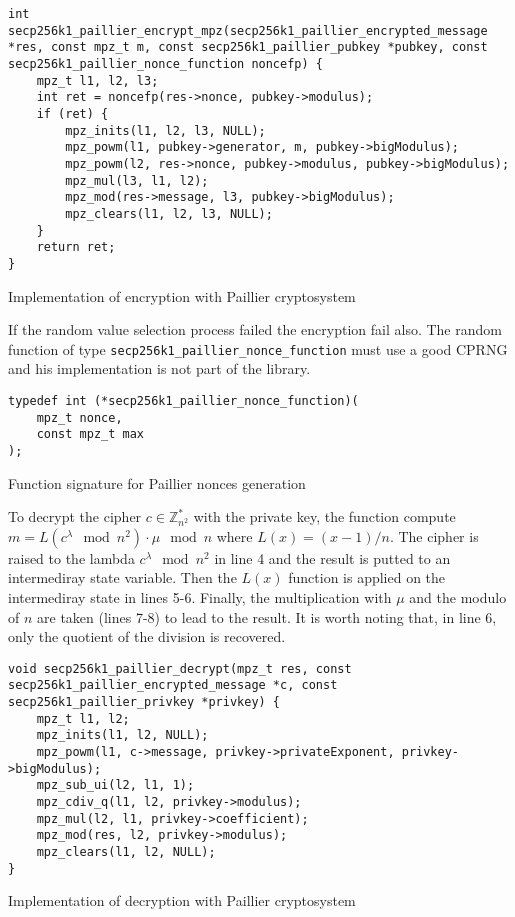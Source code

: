 \begin{listing}
  \begin{verbatim}
int secp256k1_paillier_encrypt_mpz(secp256k1_paillier_encrypted_message *res, const mpz_t m, const secp256k1_paillier_pubkey *pubkey, const secp256k1_paillier_nonce_function noncefp) {
    mpz_t l1, l2, l3;
    int ret = noncefp(res->nonce, pubkey->modulus);
    if (ret) {
        mpz_inits(l1, l2, l3, NULL);
        mpz_powm(l1, pubkey->generator, m, pubkey->bigModulus);
        mpz_powm(l2, res->nonce, pubkey->modulus, pubkey->bigModulus);
        mpz_mul(l3, l1, l2);
        mpz_mod(res->message, l3, pubkey->bigModulus);
        mpz_clears(l1, l2, l3, NULL);
    }
    return ret;
}
  \end{verbatim}
	\caption{Implementation of encryption with Paillier cryptosystem}
	\label{lst:implEncryptPaillier}
\end{listing}

If the random value selection
process failed the encryption fail also. The random function of type
\texttt{secp256k1\_paillier\_nonce\_function} must use a good CPRNG and his implementation
is not part of the library.

\begin{listing}
  \begin{verbatim}
typedef int (*secp256k1_paillier_nonce_function)(
    mpz_t nonce,
    const mpz_t max
);
  \end{verbatim}
	\caption{Function signature for Paillier nonces generation}
	\label{lst:PaillierNoncesSigFunc}
\end{listing}

To decrypt the cipher $c \in \mathbb{Z}_{n^2}^*$ with the private key, the function
compute $m = L(c^{\lambda} \mod n^2) \cdot \mu \mod n$ where $L(x) = (x - 1) / n$.
The cipher is raised to the lambda $c^{\lambda} \mod n^2$ in line 4 and the result
is putted to an intermediray state variable. Then the $L(x)$ function is applied
on the intermediray state in lines 5-6. Finally, the multiplication with $\mu$ and
the modulo of $n$ are taken (lines 7-8) to lead to the result. It is worth noting
that, in line 6, only the quotient of the division is recovered.

\begin{listing}
  \begin{verbatim}
void secp256k1_paillier_decrypt(mpz_t res, const secp256k1_paillier_encrypted_message *c, const secp256k1_paillier_privkey *privkey) {
    mpz_t l1, l2;
    mpz_inits(l1, l2, NULL);
    mpz_powm(l1, c->message, privkey->privateExponent, privkey->bigModulus);
    mpz_sub_ui(l2, l1, 1);
    mpz_cdiv_q(l1, l2, privkey->modulus);
    mpz_mul(l2, l1, privkey->coefficient);
    mpz_mod(res, l2, privkey->modulus);
    mpz_clears(l1, l2, NULL);
}
  \end{verbatim}
	\caption{Implementation of decryption with Paillier cryptosystem}
	\label{lst:implDecryptPaillier}
\end{listing}

